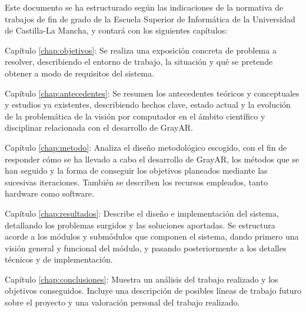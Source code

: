   Este documento se ha estructurado según las indicaciones de la normativa de trabajos de fin de grado de la Escuela Superior de Informática de la Universidad de Castilla-La Mancha, y contará con los siguientes capítulos:
  \begin{definitionlist}
  \item[Capítulo \ref{chap:objetivos}: \nameref{chap:objetivos}] Se realiza una exposición concreta de problema a resolver, describiendo el entorno de trabajo, la situación y qué se pretende obtener a modo de requisitos del sistema.

  \item[Capítulo \ref{chap:antecedentes}: \nameref{chap:antecedentes}] Se resumen los antecedentes teóricos y conceptuales y estudios ya existentes, describiendo hechos clave, estado actual y la evolución de la problemática de la visión por computador en el ámbito científico y disciplinar relacionada con el desarrollo de GrayAR.

  \item[Capítulo \ref{chap:metodo}: \nameref{chap:metodo}] Analiza el diseño metodológico escogido, con el fin de responder cómo se ha llevado a cabo el desarrollo de GrayAR, los métodos que se han seguido y la forma de conseguir los objetivos planeados mediante las sucesivas iteraciones. También se describen los recursos empleados, tanto hardware como software.

  \item[Capítulo \ref{chap:resultados}: \nameref{chap:resultados}] Describe el diseño e implementación del sistema, detallando los problemas surgidos y las soluciones aportadas. Se estructura acorde a los módulos y
submódulos que componen el sistema, dando primero una visión general y funcional del módulo, y pasando posteriormente a los detalles técnicos y de implementación.

  \item[Capítulo \ref{chap:conclusiones}: \nameref{chap:conclusiones}] Muestra un análisis del trabajo realizado y los objetivos conseguidos. Incluye una descripción de posibles líneas de trabajo futuro sobre el proyecto y una valoración personal del trabajo realizado.

  \end{definitionlist}



